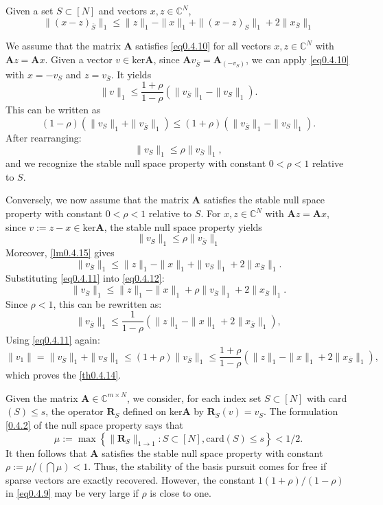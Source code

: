 \begin{lemma}
    \label{lm0.4.15}
    Given a set $S \subset [N]$ and vectors $x,z \in \mathbb{C}^N$,
    \[
        \|(x-z)_{\overline{S}}\|_1 \leq \|z\|_1 - \|x\|_1 + \|(x-z)_S\|_1 + 2\|x_{\overline{S}}\|_1
    \]
\end{lemma}

We assume that the matrix $\mathbf{A}$ satisfies \cref{eq0.4.10} for all vectors $x,z \in \mathbb{C}^N$ with $\mathbf{A}z = \mathbf{A}x$. Given a vector $v \in \text{ker}\mathbf{A}$, since $\mathbf{A}v_{\overline{S}} = \mathbf{A}_{(-v_S)}$, we can apply \cref{eq0.4.10} with $x = -v_S$ and $z = v_{\overline{S}}$. It yields
\[
    \|v\|_1 \leq \frac{1+\rho}{1-\rho}\left( \|v_{\overline{S}}\|_1 - \|v_S\|_1 \right).
\]
This can be written as 
\[
    (1-\rho)(\|v_S\|_1 + \|v_{\overline{S}}\|_1) \leq (1+\rho)(\|v_{\overline{S}}\|_1 - \|v_S\|_1).
\]
After rearranging:
\[
    \|v_S\|_1 \leq \rho \|v_{\overline{S}}\|_1,
\]
and we recognize the stable null space property with constant $0 < \rho <1$ relative to $S$.

Conversely, we now assume that the matrix $\mathbf{A}$ satisfies the stable null space property with constant $0<\rho<1$ relative to $S$. For $x,z \in \mathbb{C}^N$ with $\mathbf{A}z = \mathbf{A}x$, since $v := z-x \in \text{ker}\mathbf{A}$, the stable null space property yields
\begin{equation}
    \|v_S\|_1 \leq \rho \|v_{\overline{S}}\|_1
    \label{eq0.4.11}
\end{equation}
Moreover, \cref{lm0.4.15} gives
\begin{equation}
    \|v_{\overline{S}}\|_1 \leq \|z\|_1 - \|x\|_1 + \|v_S\|_1 + 2\|x_{\overline{S}}\|_1.
    \label{eq0.4.12}
\end{equation}
Substituting \cref{eq0.4.11} into \cref{eq0.4.12}:
\[
    \|v_{\overline{S}}\|_1 \leq \|z\|_1 - \|x\|_1 + \rho \|v_{\overline{S}}\|_1 + 2\|x_{\overline{S}}\|_1.
\]
Since $\rho < 1$, this can be rewritten as:
\[
    \|v_{\overline{S}}\|_1 \leq \frac{1}{1-\rho}\left( \|z\|_1 -\|x\|_1 + 2\|x_{\overline{S}}\|_1 \right),
\]
Using \cref{eq0.4.11} again:
\[
    \|v_1\| = \|v_{\overline{S}}\|_1 + \|v_S\|_1 \leq (1+\rho)\|v_{\overline{S}}\|_1 \leq \frac{1+\rho}{1-\rho}\left( \|z\|_1 - \|x\|_1 + 2\|x_{\overline{S}}\|_1 \right),
\]
which proves the \cref{th0.4.14}.


\begin{remark}
    \label{rmk0.4.16}
    Given the matrix $\mathbf{A} \in \mathbb{C}^{m \times N}$, we consider, for each index set $S \subset [N]$ with card$(S) \leq s$, the operator $\mathbf{R}_S$ defined on ker$\mathbf{A}$ by $\mathbf{R}_S(v) = v_S$. The formulation \cref{0.4.2} of the null space property says that
    \[
        \mu := \max\left\{ \|\mathbf{R}_S\|_{1\rightarrow 1} : S \subset [N], \text{card}(S) \leq s \right\} < 1/2.
    \]
    It then follows that $\mathbf{A}$ satisfies the stable null space property with constant $\rho := \mu / (\bigcap\mu)<1$. Thus, the stability of the basis pursuit comes for free if sparse vectors are exactly recovered. However, the constant $1(1+\rho)/(1-\rho)$ in \cref{eq0.4.9} may be very large if $\rho$ is close to one.
\end{remark}

